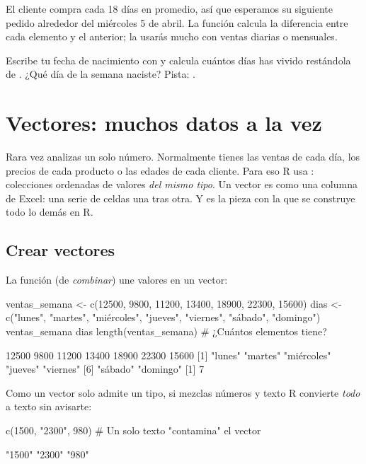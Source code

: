 El cliente compra cada 18 días en promedio, así que esperamos su siguiente
pedido alrededor del miércoles 5 de abril. La función 
calcula la diferencia entre cada elemento y el anterior; la usarás mucho
con ventas diarias o mensuales.

\begin{hazlotu}
Escribe tu fecha de nacimiento con  y calcula cuántos
días has vivido restándola de . ¿Qué día de la semana
naciste? Pista: .
\end{hazlotu}

\section{Vectores: muchos datos a la vez}
\label{sec:m1-vectores}

Rara vez analizas un solo número. Normalmente tienes las ventas de cada día,
los precios de cada producto o las edades de cada cliente. Para eso R usa
: colecciones ordenadas de valores \emph{del mismo tipo}.
Un vector es como una columna de Excel: una serie de celdas una tras otra.
Y es la pieza con la que se construye todo lo demás en R.

\subsection{Crear vectores}

La función  (de \emph{combinar}) une valores en un vector:

\begin{rcode}
ventas_semana <- c(12500, 9800, 11200, 13400, 18900, 22300, 15600)
dias <- c("lunes", "martes", "miércoles", "jueves", "viernes",
          "sábado", "domingo")
ventas_semana
dias
length(ventas_semana)      # ¿Cuántos elementos tiene?
\end{rcode}
\begin{rsalida}
[1] 12500  9800 11200 13400 18900 22300 15600
[1] "lunes"     "martes"    "miércoles" "jueves"    "viernes"  
[6] "sábado"    "domingo"  
[1] 7
\end{rsalida}

Como un vector solo admite un tipo, si mezclas números y texto R convierte
\emph{todo} a texto sin avisarte:

\begin{rcode}
c(1500, "2300", 980)       # Un solo texto "contamina" el vector
\end{rcode}
\begin{rsalida}
[1] "1500" "2300" "980" 
\end{rsalida}

